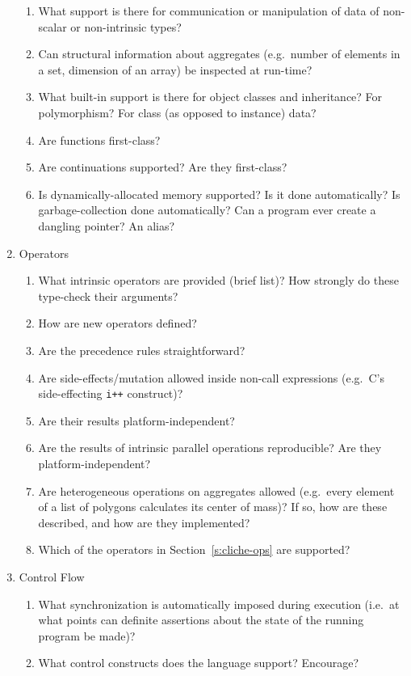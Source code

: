 \begin{enumerate}
\begin{enumerate}
  \item What support is there for communication or manipulation
	of data of non-scalar or non-intrinsic types?
  \item Can structural information about aggregates
	(e.g.\ number of elements in a set, dimension of an array)
	be inspected at run-time?
  \item What built-in support is there for object classes and inheritance?
	For polymorphism?
	For class (as opposed to instance) data?
  \item Are functions first-class?
  \item Are continuations supported?  Are they first-class?
  \item Is dynamically-allocated memory supported?
	Is it done automatically?
	Is garbage-collection done automatically?
	Can a program ever create a dangling pointer?
	An alias?
  \end{enumerate}
\item Operators
  \begin{enumerate}
  \item What intrinsic operators are provided (brief list)?
	How strongly do these type-check their arguments?
  \item How are new operators defined?
  \item Are the precedence rules straightforward?
  \item Are side-effects/mutation allowed inside non-call expressions
	(e.g.\ C's side-effecting \verb`i++` construct)?
  \item Are their results platform-independent?
  \item Are the results of intrinsic parallel operations reproducible?
	Are they platform-independent?
  \item Are heterogeneous operations on aggregates allowed
	(e.g.\ every element of a list of polygons calculates its
	center of mass)?
	If so, how are these described, and how are they implemented?
  \item Which of the operators in Section~\ref{s:cliche-ops} are supported?
  \end{enumerate}
\item Control Flow
  \begin{enumerate}
  \item What synchronization is automatically imposed during execution
	(i.e.\ at what points can definite assertions about the state
	of the running program be made)?
  \item What control constructs does the language support?  Encourage?

\end{enumerate}
\end{enumerate}
